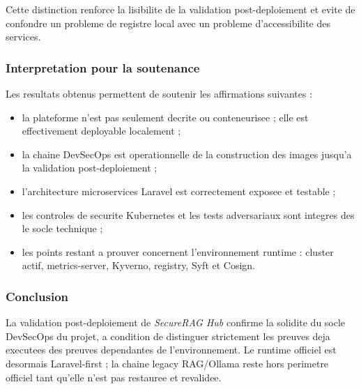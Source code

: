 Cette distinction renforce la lisibilite de la validation post-deploiement et evite de confondre un probleme de registre local avec un probleme d'accessibilite des services.

\subsubsection{Interpretation pour la soutenance}

Les resultats obtenus permettent de soutenir les affirmations suivantes :

\begin{itemize}
  \item la plateforme n'est pas seulement decrite ou conteneurisee ; elle est effectivement deployable localement ;
  \item la chaine DevSecOps est operationnelle de la construction des images jusqu'a la validation post-deploiement ;
  \item l'architecture microservices Laravel est correctement exposee et testable ;
  \item les controles de securite Kubernetes et les tests adversariaux sont integres des le socle technique ;
  \item les points restant a prouver concernent l'environnement runtime : cluster actif, metrics-server, Kyverno, registry, Syft et Cosign.
\end{itemize}

\subsubsection{Conclusion}

La validation post-deploiement de \textit{SecureRAG Hub} confirme la solidite du socle DevSecOps du projet, a condition de distinguer strictement les preuves deja executees des preuves dependantes de l'environnement. Le runtime officiel est desormais Laravel-first ; la chaine legacy RAG/Ollama reste hors perimetre officiel tant qu'elle n'est pas restauree et revalidee.
